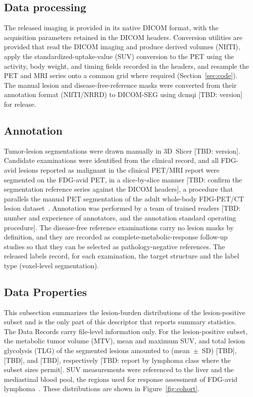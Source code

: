 \subsection*{Data processing}\label{subsec:processing}
The released imaging is provided in its native DICOM format, with the acquisition parameters retained in the DICOM headers.
Conversion utilities are provided that read the DICOM imaging and produce derived volumes (NIfTI), apply the standardized-uptake-value (SUV) conversion to the PET using the activity, body weight, and timing fields recorded in the headers, and resample the PET and MRI series onto a common grid where required (Section~\ref{sec:code}).
The manual lesion and disease-free-reference masks were converted from their annotation format (NIfTI/NRRD) to DICOM-SEG using dcmqi [TBD: version] for release.

\subsection*{Annotation}\label{subsec:annotation}
Tumor-lesion segmentations were drawn manually in 3D~Slicer [TBD: version].
Candidate examinations were identified from the clinical record, and all FDG-avid lesions reported as malignant in the clinical PET/MRI report were segmented on the FDG-avid PET, in a slice-by-slice manner [TBD: confirm the segmentation reference series against the DICOM headers], a procedure that parallels the manual PET segmentation of the adult whole-body FDG-PET/CT lesion dataset~\cite{Gatidis_2022}.
Annotation was performed by a team of trained readers [TBD: number and experience of annotators, and the annotation standard operating procedure].
The disease-free reference examinations carry no lesion masks by definition, and they are recorded as complete-metabolic-response follow-up studies so that they can be selected as pathology-negative references.
The released labels record, for each examination, the target structure and the label type (voxel-level segmentation).

\subsection*{Data Properties}\label{subsec:properties}
This subsection summarizes the lesion-burden distributions of the lesion-positive subset and is the only part of this descriptor that reports summary statistics.
The Data Records carry file-level information only.
For the lesion-positive subset, the metabolic tumor volume (MTV), mean and maximum SUV, and total lesion glycolysis (TLG) of the segmented lesions amounted to (mean~$\pm$~SD) [TBD], [TBD], and [TBD], respectively [TBD: report by lymphoma class where the subset sizes permit].
SUV measurements were referenced to the liver and the mediastinal blood pool, the regions used for response assessment of FDG-avid lymphoma~\cite{Barrington_2017}.
These distributions are shown in Figure~\ref{fig:cohort}.
